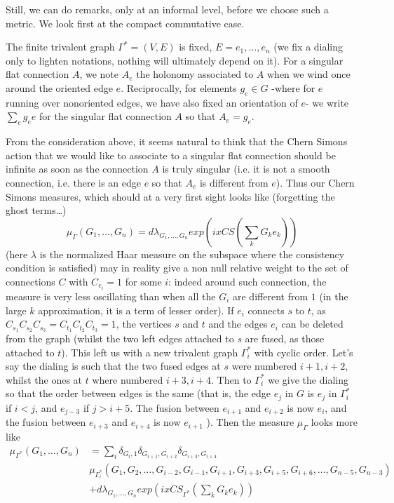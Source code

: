 \documentclass[10pt]{article}
\begin{document}
Still, we can do remarks, only at an informal level, before we choose such a metric. We look first at the compact commutative case.

The finite trivalent graph $\Gamma^*=(V,E)$ is fixed, $E=e_1,\dots ,e_n$ (we fix a dialing only to lighten notations, nothing will ultimately depend on it). For a singular flat connection $A$, we note $A_e$ the holonomy associated to $A$ when we wind once around the oriented edge $e$. Reciprocally, for elements $g_e\in G$ -where for $e$ running over nonoriented edges, we have also fixed an orientation of $e$- we write $\sum_e  g_e e$ for the singular flat connection $A$ so that $A_e=g_e$.

From the consideration above, it seems natural to think that the Chern Simons action that we would like to associate to a singular flat connection should be infinite as soon as the connection $A$ is truly singular (i.e. it is not a smooth connection, i.e. there is an edge $e$ so that $A_e$ is different from $e$). Thus our Chern Simons measures, which should at a very first sight looks like (forgetting the ghost terms\dots ) \[\mu_\Gamma(G_1,\dots,G_n)=d\lambda_{G_1,\dots , G_n} exp(i x CS(\sum_k G_k e_k))\] (here $\lambda$ is the normalized Haar measure on the subspace where the consistency condition is satisfied) may in reality give a non null relative weight to the set of connections $C$ with $C_{e_i}=1$ for some $i$: indeed around such connection, the measure is very less oscillating than when all the $G_i$ are different from $1$ (in the large $k$ approximation, it is a term of lesser order). If $e_i$ connects $s$ to $t$, as $C_{s_1}C_{s_2}C_{s_3}=C_{t_1}C_{t_2}C_{t_3}=1$,
the vertices $s$ and $t$ and the edges $e_i$ can be deleted from the graph (whilst the two left edges attached to $s$ are fused, as those attached to $t$). This left us with a new trivalent graph $\Gamma_i^*$ with cyclic order. Let's say the dialing is such that the two fused edges at $s$ were numbered $i+1,i+2$, whilst the ones at $t$ where numbered $i+3,i+4$. Then to $\Gamma_i^*$ we give the dialing so that the order between edges is the same (that is, the edge $e_j$ in $G$ is $e_j$ in $\Gamma_i^*$ if $i<j$, and $e_{j-3}$ if $j>i+5$. The fusion between $e_{i+1}$ and $e_{i+2}$ is now $e_i$, and the fusion between $e_{i+3}$ and $e_{i+4}$ is now $e_{i+1}$ ).
Then the measure $\mu_\Gamma$ looks more like \begin{align*}
\mu_{\Gamma^*}(G_1,\dots,G_n)&=\sum_i \delta_{G_i,1} \delta_{G_{i+1},G_{i+2}} \delta_{G_{i+3},G_{i+4}}  \\
&\mu_{\Gamma^*_i}(G_1, G_2,\dots,G_{i-2}, G_{i-1},G_{i+1},G_{i+3},G_{i+5},G_{i+6},\dots,G_{n-5}, G_{n-3})\\ &+ d\lambda_{G_1,\dots, G_n} exp(i x CS_{\Gamma^*} (\sum_k G_k e_k))\end{align*}
\end{document}
